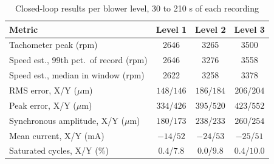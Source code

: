 \begin{table}[htbp]
\caption{Closed-loop results per blower level, 30 to 210 s of each recording}
\label{tab:results}
\centering
\setlength{\tabcolsep}{4pt}
\begin{tabular}{lccc}
\hline
\textbf{Metric} & \textbf{Level 1} & \textbf{Level 2} & \textbf{Level 3} \\
\hline
Tachometer peak (rpm) & 2646 & 3265 & 3500 \\
Speed est., 99th pct.\ of record (rpm) & 2646 & 3276 & 3558 \\
Speed est., median in window (rpm) & 2622 & 3258 & 3378 \\
RMS error, X/Y ($\mu$m) & $148$/$146$ & $186$/$184$ & $206$/$204$ \\
Peak error, X/Y ($\mu$m) & $334$/$426$ & $395$/$520$ & $423$/$552$ \\
Synchronous amplitude, X/Y ($\mu$m) & $180$/$173$ & $238$/$233$ & $260$/$254$ \\
Mean current, X/Y (mA) & $-14$/$52$ & $-24$/$53$ & $-25$/$51$ \\
Saturated cycles, X/Y (\%) & $0.4$/$7.8$ & $0.0$/$9.8$ & $0.4$/$10.0$ \\
\hline
\end{tabular}
\end{table}
